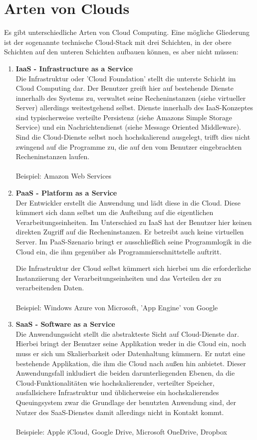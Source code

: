 \section{Arten von Clouds}
Es gibt unterschiedliche Arten von Cloud Computing. Eine mögliche Gliederung ist der sogenannte technische Cloud-Stack mit drei Schichten, in der obere Schichten auf den unteren Schichten aufbauen können, es aber nicht müssen:
\begin{enumerate}
\item \textbf{IaaS - Infrastructure as a Service}\\
Die Infrastruktur oder 'Cloud Foundation' stellt die unterste Schicht im Cloud Computing dar. Der Benutzer greift hier auf bestehende Dienste innerhalb des Systems zu, verwaltet seine Recheninstanzen (siehe virtueller Server) allerdings weitestgehend selbst. Dienste innerhalb des IaaS-Konzeptes sind typischerweise verteilte Persistenz (siehe Amazons Simple Storage Service) und ein Nachrichtendienst (siehe Message Oriented Middleware). Sind die Cloud-Dienste selbst noch hochskalierend ausgelegt, trifft dies nicht zwingend auf die Programme zu, die auf den vom Benutzer eingebrachten Recheninstanzen laufen.\\\\
Beispiel: Amazon Web Services
\item \textbf{PaaS - Platform as a Service}\\
Der Entwickler erstellt die Anwendung und lädt diese in die Cloud. Diese kümmert sich dann selbst um die Aufteilung auf die eigentlichen Verarbeitungseinheiten. Im Unterschied zu IaaS hat der Benutzer hier keinen direkten Zugriff auf die Recheninstanzen. Er betreibt auch keine virtuellen Server. Im PaaS-Szenario bringt er ausschließlich seine Programmlogik in die Cloud ein, die ihm gegenüber als Programmierschnittstelle auftritt.

Die Infrastruktur der Cloud selbst kümmert sich hierbei um die erforderliche Instanziierung der Verarbeitungseinheiten und das Verteilen der zu verarbeitenden Daten.\\\\
Beispiel: Windows Azure von Microsoft, 'App Engine' von Google
\item \textbf{SaaS - Software as a Service}\\
Die Anwendungssicht stellt die abstrakteste Sicht auf Cloud-Dienste dar. Hierbei bringt der Benutzer seine Applikation weder in die Cloud ein, noch muss er sich um Skalierbarkeit oder Datenhaltung kümmern. Er nutzt eine bestehende Applikation, die ihm die Cloud nach außen hin anbietet. Dieser Anwendungsfall inkludiert die beiden darunterliegenden Ebenen, da die Cloud-Funktionalitäten wie hochskalierender, verteilter Speicher, ausfallsichere Infrastruktur und üblicherweise ein hochskalierendes Queuingsystem zwar die Grundlage der benutzten Anwendung sind, der Nutzer des SaaS-Dienstes damit allerdings nicht in Kontakt kommt.\\\\
Beispiele: Apple iCloud, Google Drive, Microsoft OneDrive, Dropbox
\end{enumerate}

